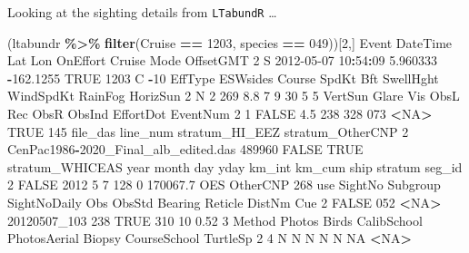 \documentclass[
]{book}
\newenvironment{Shaded}{\begin{snugshade}}{\end{snugshade}}
\newcommand{\ConstantTok}[1]{\textcolor[rgb]{0.56,0.35,0.01}{#1}}
\newcommand{\DecValTok}[1]{\textcolor[rgb]{0.00,0.00,0.81}{#1}}
\newcommand{\FloatTok}[1]{\textcolor[rgb]{0.00,0.00,0.81}{#1}}
\newcommand{\FunctionTok}[1]{\textcolor[rgb]{0.13,0.29,0.53}{\textbf{#1}}}
\newcommand{\NormalTok}[1]{#1}
\newcommand{\SpecialCharTok}[1]{\textcolor[rgb]{0.81,0.36,0.00}{\textbf{#1}}}
\newcommand{\StringTok}[1]{\textcolor[rgb]{0.31,0.60,0.02}{#1}}
\begin{document}
Looking at the sighting details from \texttt{LTabundR} \ldots{}

\begin{Shaded}
\begin{Highlighting}[]
\NormalTok{(ltabundr }\SpecialCharTok{\%\textgreater{}\%} \FunctionTok{filter}\NormalTok{(Cruise }\SpecialCharTok{==} \DecValTok{1203}\NormalTok{, species }\SpecialCharTok{==} \StringTok{\textquotesingle{}049\textquotesingle{}}\NormalTok{))[}\DecValTok{2}\NormalTok{,]}
\NormalTok{  Event            DateTime      Lat       Lon OnEffort Cruise Mode OffsetGMT}
\DecValTok{2}\NormalTok{     S }\DecValTok{2012{-}05{-}07} \DecValTok{10}\SpecialCharTok{:}\DecValTok{54}\SpecialCharTok{:}\DecValTok{09} \FloatTok{5.960333} \SpecialCharTok{{-}}\FloatTok{162.1255}     \ConstantTok{TRUE}   \DecValTok{1203}\NormalTok{    C       }\SpecialCharTok{{-}}\DecValTok{10}
\NormalTok{  EffType ESWsides Course SpdKt Bft SwellHght WindSpdKt RainFog HorizSun}
\DecValTok{2}\NormalTok{       N        }\DecValTok{2}    \DecValTok{269}   \FloatTok{8.8}   \DecValTok{7}         \DecValTok{9}        \DecValTok{30}       \DecValTok{5}        \DecValTok{5}
\NormalTok{  VertSun Glare Vis ObsL Rec ObsR ObsInd EffortDot EventNum}
\DecValTok{2}       \DecValTok{1} \ConstantTok{FALSE} \FloatTok{4.5}  \DecValTok{238} \DecValTok{328}  \DecValTok{073}   \SpecialCharTok{\textless{}}\ConstantTok{NA}\SpecialCharTok{\textgreater{}}      \ConstantTok{TRUE}      \DecValTok{145}
\NormalTok{                              file\_das line\_num stratum\_HI\_EEZ stratum\_OtherCNP}
\DecValTok{2}\NormalTok{ CenPac1986}\SpecialCharTok{{-}}\NormalTok{2020\_Final\_alb\_edited.das   }\DecValTok{489960}          \ConstantTok{FALSE}             \ConstantTok{TRUE}
\NormalTok{  stratum\_WHICEAS year month day yday km\_int   km\_cum ship  stratum seg\_id}
\DecValTok{2}           \ConstantTok{FALSE} \DecValTok{2012}     \DecValTok{5}   \DecValTok{7}  \DecValTok{128}      \DecValTok{0} \FloatTok{170067.7}\NormalTok{  OES OtherCNP    }\DecValTok{268}
\NormalTok{    use SightNo Subgroup SightNoDaily Obs ObsStd Bearing Reticle DistNm Cue}
\DecValTok{2} \ConstantTok{FALSE}     \DecValTok{052}     \SpecialCharTok{\textless{}}\ConstantTok{NA}\SpecialCharTok{\textgreater{}}\NormalTok{ 20120507\_103 }\DecValTok{238}   \ConstantTok{TRUE}     \DecValTok{310}      \DecValTok{10}   \FloatTok{0.52}   \DecValTok{3}
\NormalTok{  Method Photos Birds CalibSchool PhotosAerial Biopsy CourseSchool TurtleSp}
\DecValTok{2}      \DecValTok{4}\NormalTok{      N     N           N            N      N           }\ConstantTok{NA}     \SpecialCharTok{\textless{}}\ConstantTok{NA}\SpecialCharTok{\textgreater{}}

\end{Highlighting}
\end{Shaded}
\end{document}
